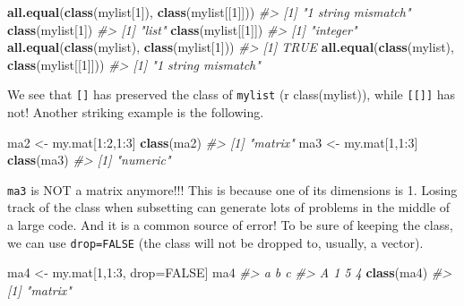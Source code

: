 \documentclass[]{book}
\newenvironment{Shaded}{}{}
\newcommand{\CommentTok}[1]{\textcolor[rgb]{0.38,0.63,0.69}{\textit{#1}}}
\newcommand{\DecValTok}[1]{\textcolor[rgb]{0.25,0.63,0.44}{#1}}
\newcommand{\KeywordTok}[1]{\textcolor[rgb]{0.00,0.44,0.13}{\textbf{#1}}}
\newcommand{\NormalTok}[1]{#1}
\newcommand{\OperatorTok}[1]{\textcolor[rgb]{0.40,0.40,0.40}{#1}}
\newcommand{\OtherTok}[1]{\textcolor[rgb]{0.00,0.44,0.13}{#1}}
\newcommand{\StringTok}[1]{\textcolor[rgb]{0.25,0.44,0.63}{#1}}
\theoremstyle{definition}
\theoremstyle{definition}
\theoremstyle{definition}
\theoremstyle{remark}
\begin{document}
\begin{Shaded}
\begin{Highlighting}[]
\KeywordTok{all.equal}\NormalTok{(}\KeywordTok{class}\NormalTok{(mylist[}\DecValTok{1}\NormalTok{]), }\KeywordTok{class}\NormalTok{(mylist[[}\DecValTok{1}\NormalTok{]]))}
\CommentTok{#> [1] "1 string mismatch"}
\KeywordTok{class}\NormalTok{(mylist[}\DecValTok{1}\NormalTok{])}
\CommentTok{#> [1] "list"}
\KeywordTok{class}\NormalTok{(mylist[[}\DecValTok{1}\NormalTok{]])}
\CommentTok{#> [1] "integer"}
\KeywordTok{all.equal}\NormalTok{(}\KeywordTok{class}\NormalTok{(mylist), }\KeywordTok{class}\NormalTok{(mylist[}\DecValTok{1}\NormalTok{]))}
\CommentTok{#> [1] TRUE}
\KeywordTok{all.equal}\NormalTok{(}\KeywordTok{class}\NormalTok{(mylist), }\KeywordTok{class}\NormalTok{(mylist[[}\DecValTok{1}\NormalTok{]]))}
\CommentTok{#> [1] "1 string mismatch"}
\end{Highlighting}
\end{Shaded}

We see that \texttt{{[}{]}} has preserved the class of \texttt{mylist}
(r class(mylist)), while \texttt{{[}{[}{]}{]}} has not! Another striking
example is the following.

\begin{Shaded}
\begin{Highlighting}[]
\NormalTok{ma2 <-}\StringTok{ }\NormalTok{my.mat[}\DecValTok{1}\OperatorTok{:}\DecValTok{2}\NormalTok{,}\DecValTok{1}\OperatorTok{:}\DecValTok{3}\NormalTok{]}
\KeywordTok{class}\NormalTok{(ma2)}
\CommentTok{#> [1] "matrix"}
\NormalTok{ma3 <-}\StringTok{ }\NormalTok{my.mat[}\DecValTok{1}\NormalTok{,}\DecValTok{1}\OperatorTok{:}\DecValTok{3}\NormalTok{]}
\KeywordTok{class}\NormalTok{(ma3)}
\CommentTok{#> [1] "numeric"}
\end{Highlighting}
\end{Shaded}

\texttt{ma3} is NOT a matrix anymore!!! This is because one of its
dimensions is 1. Losing track of the class when subsetting can generate
lots of problems in the middle of a large code. And it is a common
source of error! To be sure of keeping the class, we can use
\texttt{drop=FALSE} (the class will not be dropped to, usually, a
vector).

\begin{Shaded}
\begin{Highlighting}[]
\NormalTok{ma4 <-}\StringTok{ }\NormalTok{my.mat[}\DecValTok{1}\NormalTok{,}\DecValTok{1}\OperatorTok{:}\DecValTok{3}\NormalTok{, drop=}\OtherTok{FALSE}\NormalTok{]}
\NormalTok{ma4}
\CommentTok{#>   a b c}
\CommentTok{#> A 1 5 4}
\KeywordTok{class}\NormalTok{(ma4)}
\CommentTok{#> [1] "matrix"}
\end{Highlighting}
\end{Shaded}
\end{document}
